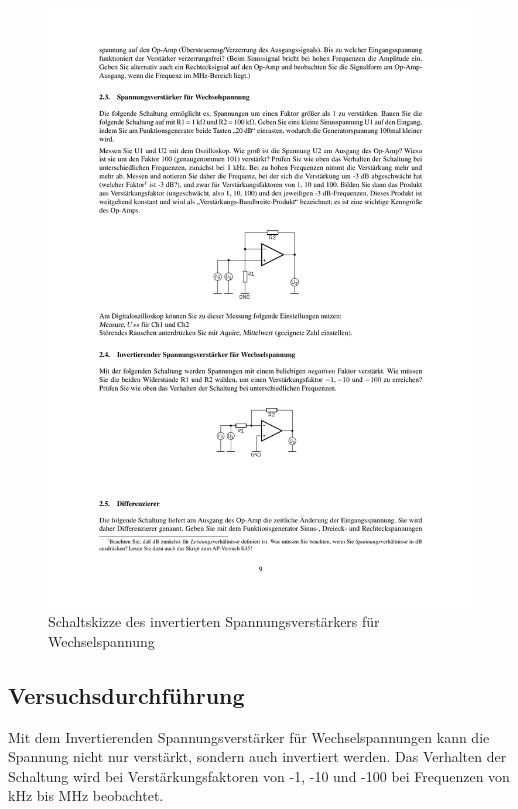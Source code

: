 \documentclass[12pt,a4paper]{article}
\begin{document}
\begin{figure}[H] 
  \centering
    \includegraphics[trim = 10mm 65mm 10mm 195mm, clip, scale = 1]{ep4_14[Page9].pdf}
  	\caption[Schaltskizze des invertierten Spannungsverstärkers für Wechselspannung]{Schaltskizze des invertierten Spannungsverstärkers für Wechselspannung\footnotemark}
  \label{fig:1}
\end{figure}

\subsection{Versuchsdurchführung}
Mit dem Invertierenden Spannungsverstärker für Wechselspannungen kann die Spannung nicht nur verstärkt, sondern auch invertiert werden. Das Verhalten der Schaltung wird bei Verstärkungsfaktoren von -1, -10 und -100 bei Frequenzen von \unit[1]{kHz} bis \unit[1]{MHz} beobachtet.
\end{document}

